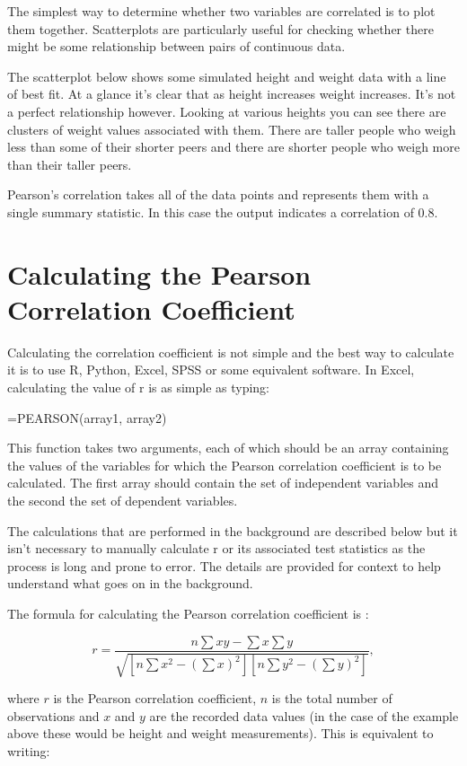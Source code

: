 \documentclass[
]{book}
\begin{document}
The simplest way to determine whether two variables are correlated is to plot them together. Scatterplots are particularly useful for checking whether there might be some relationship between pairs of continuous data.

The scatterplot below shows some simulated height and weight data with a line of best fit. At a glance it's clear that as height increases weight increases. It's not a perfect relationship however. Looking at various heights you can see there are clusters of weight values associated with them. There are taller people who weigh less than some of their shorter peers and there are shorter people who weigh more than their taller peers.

Pearson's correlation takes all of the data points and represents them with a single summary statistic. In this case the output indicates a correlation of 0.8.

\hypertarget{calculating-the-pearson-correlation-coefficient}{%
\section{Calculating the Pearson Correlation Coefficient}\label{calculating-the-pearson-correlation-coefficient}}

Calculating the correlation coefficient is not simple and the best way to calculate it is to use R, Python, Excel, SPSS or some equivalent software. In Excel, calculating the value of r is as simple as typing:

=PEARSON(array1, array2)

This function takes two arguments, each of which should be an array containing the values of the variables for which the Pearson correlation coefficient is to be calculated. The first array should contain the set of independent variables and the second the set of dependent variables.

The calculations that are performed in the background are described below but it isn't necessary to manually calculate r or its associated test statistics as the process is long and prone to error. The details are provided for context to help understand what goes on in the background.

The formula for calculating the Pearson correlation coefficient is \citep{swinscow2}:

\[r = \frac{n \sum{xy}-\sum{x} \sum{y}}{\sqrt{[n \sum{x^2}-(\sum{x})^2][n \sum{y^2}-(\sum{y})^2]}}, \]

where \(r\) is the Pearson correlation coefficient, \(n\) is the total number of observations and \(x\) and \(y\) are the recorded data values (in the case of the example above these would be height and weight measurements). This is equivalent to writing:
\end{document}
